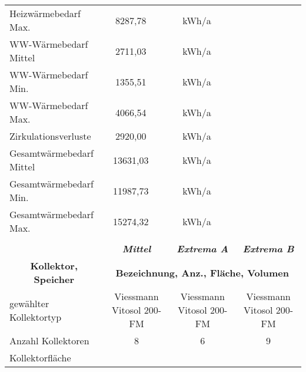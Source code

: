 \begin{table}[]
{\begin{tabular}{lcccc}
       \\ \cline{1-4}
    \multicolumn{1}{|l|}{Heizwärmebedarf   Max.} &
      \multicolumn{1}{c|}{8287,78} &
      \multicolumn{2}{c|}{kWh/a} &
       \\ \cline{1-4}
    \multicolumn{1}{|l|}{WW-Wärmebedarf   Mittel} &
      \multicolumn{1}{c|}{2711,03} &
      \multicolumn{2}{c|}{kWh/a} &
       \\ \cline{1-4}
    \multicolumn{1}{|l|}{WW-Wärmebedarf   Min.} &
      \multicolumn{1}{c|}{1355,51} &
      \multicolumn{2}{c|}{kWh/a} &
       \\ \cline{1-4}
    \multicolumn{1}{|l|}{WW-Wärmebedarf   Max.} &
      \multicolumn{1}{c|}{4066,54} &
      \multicolumn{2}{c|}{kWh/a} &
       \\ \cline{1-4}
    \multicolumn{1}{|l|}{Zirkulationsverluste} &
      \multicolumn{1}{c|}{2920,00} &
      \multicolumn{2}{c|}{kWh/a} &
       \\ \cline{1-4}
    \multicolumn{1}{|l|}{Gesamtwärmebedarf   Mittel} &
      \multicolumn{1}{c|}{13631,03} &
      \multicolumn{2}{c|}{kWh/a} &
       \\ \cline{1-4}
    \multicolumn{1}{|l|}{Gesamtwärmebedarf   Min.} &
      \multicolumn{1}{c|}{11987,73} &
      \multicolumn{2}{c|}{kWh/a} &
       \\ \cline{1-4}
    \multicolumn{1}{|l|}{Gesamtwärmebedarf   Max.} &
      \multicolumn{1}{c|}{15274,32} &
      \multicolumn{2}{c|}{kWh/a} &
       \\ \cline{1-4}
     &
       &
       &
       &
       \\ \cline{2-5} 
    \multicolumn{1}{l|}{} &
      \multicolumn{2}{c|}{\textit{\textbf{Mittel}}} &
      \multicolumn{1}{c|}{\textit{\textbf{Extrema A}}} &
      \multicolumn{1}{c|}{\cellcolor[HTML]{26C324}\textit{\textbf{Extrema B}}} \\ \cline{2-5} 
    \multicolumn{1}{c|}{\textbf{Kollektor, Speicher}} &
      \multicolumn{4}{c|}{\textbf{Bezeichnung,   Anz., Fläche, Volumen}} \\ \hline
    \multicolumn{1}{|l|}{gewählter Kollektortyp} &
      \multicolumn{2}{c|}{Viessmann Vitosol 200-FM} &
      \multicolumn{1}{c|}{Viessmann Vitosol 200-FM} &
      \multicolumn{1}{c|}{\cellcolor[HTML]{26C324}Viessmann Vitosol 200-FM} \\ \hline
    \multicolumn{1}{|l|}{Anzahl   Kollektoren} &
      \multicolumn{2}{c|}{8} &
      \multicolumn{1}{c|}{6} &
      \multicolumn{1}{c|}{\cellcolor[HTML]{26C324}9} \\ \hline
    \multicolumn{1}{|l|}{Kollektorfläche} &

\end{tabular}}
\end{table}
